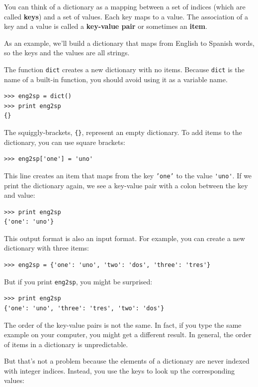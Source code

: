 \documentclass[10pt]{book}
\begin{document}
\begin{CJK}{UTF8}{gbsn}
You can think of a dictionary as a mapping between a set of indices
(which are called {\bf keys}) and a set of values.  Each key maps to a
value.  The association of a key and a value is called a {\bf
  key-value pair} or sometimes an {\bf item}.

As an example, we'll build a dictionary that maps from English
to Spanish words, so the keys and the values are all strings.

The function {\tt dict} creates a new dictionary with no items.
Because {\tt dict} is the name of a built-in function, you
should avoid using it as a variable name.

\begin{verbatim}
>>> eng2sp = dict()
>>> print eng2sp
{}
\end{verbatim}

The squiggly-brackets, \verb"{}", represent an empty dictionary.
To add items to the dictionary, you can use square brackets:

\begin{verbatim}
>>> eng2sp['one'] = 'uno'
\end{verbatim}
%
This line creates an item that maps from the key
{\tt 'one'} to the value \verb"'uno'".  If we print the
dictionary again, we see a key-value pair with a colon
between the key and value:

\begin{verbatim}
>>> print eng2sp
{'one': 'uno'}
\end{verbatim}
%
This output format is also an input format.  For example,
you can create a new dictionary with three items:

\begin{verbatim}
>>> eng2sp = {'one': 'uno', 'two': 'dos', 'three': 'tres'}
\end{verbatim}
%
But if you print {\tt eng2sp}, you might be surprised:

\begin{verbatim}
>>> print eng2sp
{'one': 'uno', 'three': 'tres', 'two': 'dos'}
\end{verbatim}
%
The order of the key-value pairs is not the same.  In fact, if
you type the same example on your computer, you might get a
different result.  In general, the order of items in
a dictionary is unpredictable.

But that's not a problem because
the elements of a dictionary are never indexed with integer indices.
Instead, you use the keys to look up the corresponding values:


\end{CJK}
\end{document}
